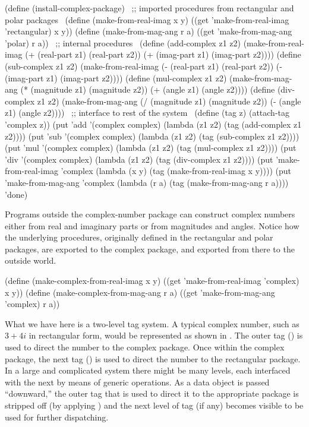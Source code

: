 \begin{codeBlock}
(define (install-complex-package)
  ~\textrm{;; imported procedures from rectangular and polar packages}~
  (define (make-from-real-imag x y)
    ((get 'make-from-real-imag 'rectangular) x y))
  (define (make-from-mag-ang r a)
    ((get 'make-from-mag-ang 'polar) r a))
  ~\textrm{;; internal procedures}~
  (define (add-complex z1 z2)
    (make-from-real-imag (+ (real-part z1)
                            (real-part z2))
                         (+ (imag-part z1)
                            (imag-part z2))))
  (define (sub-complex z1 z2)
    (make-from-real-imag (- (real-part z1)
                            (real-part z2))
                         (- (imag-part z1)
                            (imag-part z2))))
  (define (mul-complex z1 z2)
    (make-from-mag-ang (* (magnitude z1)
                          (magnitude z2))
                       (+ (angle z1)
                          (angle z2))))
  (define (div-complex z1 z2)
    (make-from-mag-ang (/ (magnitude z1)
                          (magnitude z2))
                       (- (angle z1)
                          (angle z2))))
  ~\textrm{;; interface to rest of the system}~
  (define (tag z) (attach-tag 'complex z))
  (put 'add '(complex complex)
       (lambda (z1 z2) (tag (add-complex z1 z2))))
  (put 'sub '(complex complex)
       (lambda (z1 z2) (tag (sub-complex z1 z2))))
  (put 'mul '(complex complex)
       (lambda (z1 z2) (tag (mul-complex z1 z2))))
  (put 'div '(complex complex)
       (lambda (z1 z2) (tag (div-complex z1 z2))))
  (put 'make-from-real-imag 'complex
       (lambda (x y) (tag (make-from-real-imag x y))))
  (put 'make-from-mag-ang 'complex
       (lambda (r a) (tag (make-from-mag-ang r a))))
  'done)
\end{codeBlock}

\noindent
Programs outside the complex-number package can construct complex numbers
either from real and imaginary parts or from magnitudes and angles.  Notice how
the underlying procedures, originally defined in the rectangular and polar
packages, are exported to the complex package, and exported from there to the
outside world.

\begin{codeBlock}
(define (make-complex-from-real-imag x y)
  ((get 'make-from-real-imag 'complex) x y))
(define (make-complex-from-mag-ang r a)
  ((get 'make-from-mag-ang 'complex) r a))
\end{codeBlock}

\noindent
What we have here is a two-level tag system.  A typical complex number, such as
\( 3 + 4i \) in rectangular form, would be represented as shown in .
The outer tag () is used to direct the number to the
complex package.  Once within the complex package, the next tag
() is used to direct the number to the rectangular package.
In a large and complicated system there might be many levels, each interfaced
with the next by means of generic operations.  As a data object is passed
``downward,'' the outer tag that is used to direct it to the appropriate
package is stripped off (by applying ) and the next level of tag
(if any) becomes visible to be used for further dispatching.

